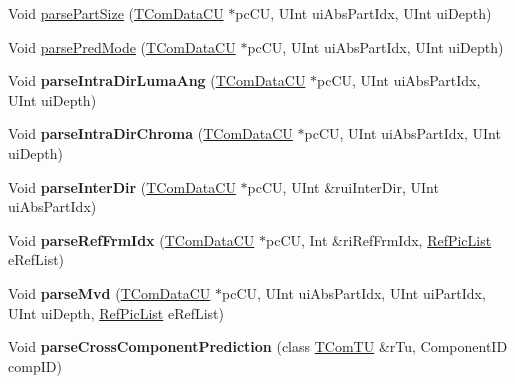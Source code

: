 \begin{DoxyCompactItemize}
Void \hyperlink{class_t_dec_sbac_a30e2e085695507dc269eaf9cdb4a8460}{parse\+Part\+Size} (\hyperlink{class_t_com_data_c_u}{T\+Com\+Data\+CU} $\ast$pc\+CU, U\+Int ui\+Abs\+Part\+Idx, U\+Int ui\+Depth)
\item 
Void \hyperlink{class_t_dec_sbac_a519477337849cf9d138379c5357868f6}{parse\+Pred\+Mode} (\hyperlink{class_t_com_data_c_u}{T\+Com\+Data\+CU} $\ast$pc\+CU, U\+Int ui\+Abs\+Part\+Idx, U\+Int ui\+Depth)
\item 
\mbox{\label{class_t_dec_sbac_a62e93149c9b93de22166c07bfe48fef4}} 
Void {\bfseries parse\+Intra\+Dir\+Luma\+Ang} (\hyperlink{class_t_com_data_c_u}{T\+Com\+Data\+CU} $\ast$pc\+CU, U\+Int ui\+Abs\+Part\+Idx, U\+Int ui\+Depth)
\item 
\mbox{\label{class_t_dec_sbac_aef8b6e9b972797b88031a1f69a10aeea}} 
Void {\bfseries parse\+Intra\+Dir\+Chroma} (\hyperlink{class_t_com_data_c_u}{T\+Com\+Data\+CU} $\ast$pc\+CU, U\+Int ui\+Abs\+Part\+Idx, U\+Int ui\+Depth)
\item 
\mbox{\label{class_t_dec_sbac_aeb2f8dacb05d4a64b4b14fbfb7f6fff2}} 
Void {\bfseries parse\+Inter\+Dir} (\hyperlink{class_t_com_data_c_u}{T\+Com\+Data\+CU} $\ast$pc\+CU, U\+Int \&rui\+Inter\+Dir, U\+Int ui\+Abs\+Part\+Idx)
\item 
\mbox{\label{class_t_dec_sbac_a1a899f420aff60a1c58a35adcca8e48f}} 
Void {\bfseries parse\+Ref\+Frm\+Idx} (\hyperlink{class_t_com_data_c_u}{T\+Com\+Data\+CU} $\ast$pc\+CU, Int \&ri\+Ref\+Frm\+Idx, \hyperlink{_type_def_8h_a93cea48eb9dcfd661168dee82e41b384}{Ref\+Pic\+List} e\+Ref\+List)
\item 
\mbox{\label{class_t_dec_sbac_afd0fa1a5ad7094e23350c063827ff5b9}} 
Void {\bfseries parse\+Mvd} (\hyperlink{class_t_com_data_c_u}{T\+Com\+Data\+CU} $\ast$pc\+CU, U\+Int ui\+Abs\+Part\+Idx, U\+Int ui\+Part\+Idx, U\+Int ui\+Depth, \hyperlink{_type_def_8h_a93cea48eb9dcfd661168dee82e41b384}{Ref\+Pic\+List} e\+Ref\+List)
\item 
\mbox{\label{class_t_dec_sbac_a90d24f042b9dcc3733d78d081e7c1a55}} 
Void {\bfseries parse\+Cross\+Component\+Prediction} (class \hyperlink{class_t_com_t_u}{T\+Com\+TU} \&r\+Tu, Component\+ID comp\+ID)
\item 

\end{DoxyCompactItemize}
